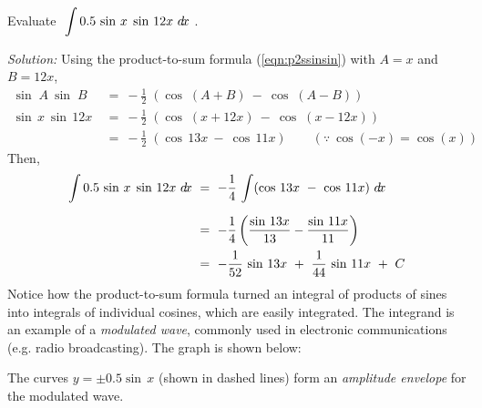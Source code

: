 \begin{exmp}\label{exmp:trigint1}
\noindent Evaluate $~\displaystyle\int 0.5\,\sin\,x\;\sin\,12x~d\!x~$.\vspace{1mm}
\par\noindent\emph{Solution:} Using the product-to-sum formula
(\ref{eqn:p2ssinsin}) with $A=x$ and $B=12x$, 
\begin{align*}
\sin\;A~\sin\;B ~&=~ -\tfrac{1}{2}\;(\cos\;(A+B) ~-~ \cos\;(A-B))\\
\sin\,x~\sin\,12x ~&=~ -\tfrac{1}{2}\;(\cos\;(x+12x) ~-~ \cos\;(x-12x))\\
                   &=~ -\tfrac{1}{2}\;(\cos\,13x ~-~ \cos\,11x)\qquad\left(\because~\cos(-x)=\cos(x)\right)
\end{align*}
Then,
\begin{align*}
\int 0.5\,\sin\,x\;\sin\,12x~d\!x ~&=~ -\frac{1}{4}\,\int (\cos\,13x ~-~ \cos\,11x)~d\!x\\[6pt]
&=~ -\frac{1}{4} \left(\frac{\sin\,13x}{13}-\frac{\sin\,11x}{11}\right)\\
&=~ -\frac{1}{52}\,\sin\,13x ~+~ \frac{1}{44}\,\sin\,11x ~+~ C
\end{align*}
Notice how the product-to-sum formula turned an integral of products of sines
into integrals of individual cosines, which are easily integrated. The integrand
is an example of a \emph{modulated wave}, commonly used in
electronic communications (e.g. radio broadcasting). The graph is shown below:
\begin{center}
\end{center}
The curves $y=\pm 0.5 \sin\,x$ (shown in dashed lines) form an \emph{amplitude
envelope} for the modulated wave.
\end{exmp}\vspace{-2mm}
